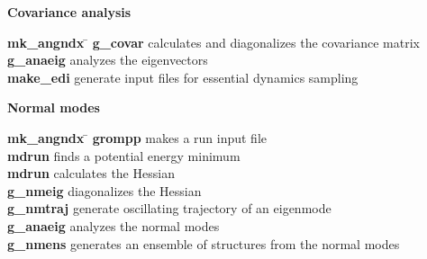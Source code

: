 \begin{description}
\item {\large\bf Covariance analysis}
\vspace{-2ex}\begin{tabbing}
{\bf mk\_angndx} \= \kill
{\bf g\_covar} \> calculates and diagonalizes the covariance matrix \\
{\bf g\_anaeig} \> analyzes the eigenvectors \\
{\bf make\_edi} \> generate input files for essential dynamics sampling \\
\end{tabbing}\vspace{-2ex}

\item {\large\bf Normal modes}
\vspace{-2ex}\begin{tabbing}
{\bf mk\_angndx} \= \kill
{\bf grompp} \> makes a run input file \\
{\bf mdrun} \> finds a potential energy minimum \\
{\bf mdrun} \> calculates the Hessian \\
{\bf g\_nmeig} \> diagonalizes the Hessian  \\
{\bf g\_nmtraj} \> generate oscillating trajectory of an eigenmode \\
{\bf g\_anaeig} \> analyzes the normal modes \\
{\bf g\_nmens} \> generates an ensemble of structures from the normal modes \\
\end{tabbing}\vspace{-2ex}

\end{description}

